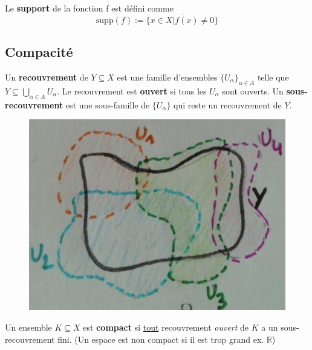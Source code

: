 \begin{definition}
    Le \textbf{support} de la fonction f est défini comme
	\begin{equation*}
		\text{supp}(f):=\overline{\{x\in X|f(x)\neq0\}}
	\end{equation*}
\end{definition}

\subsection{Compacité}

\begin{definition}
	Un \textbf{recouvrement} de $Y\subseteq X$ est une famille d'ensembles $\{U_\alpha\}_{\alpha\in A}$ telle que $Y\subseteq \bigcup_{\alpha\in A}U_\alpha$. Le recouvrement est \textbf{ouvert} si tous les $U_\alpha$ sont ouverts. Un \textbf{sous-recouvrement} est une sous-famille de $\{U_\alpha\}$ qui reste un recouvrement de $Y$. 
\end{definition}

\begin{figure}[H]
    \centering
    \includegraphics[scale = 0.4]{synthese_recouvrement.jpg}
\end{figure}

\begin{definition}
    Un ensemble $K\subseteq X$ est \textbf{compact} si \underline{tout} recouvrement \textit{ouvert} de $K$ a un sous-recouvrement fini. (Un espace est non compact si il est trop grand ex. $\mathbb{R}$)
\end{definition}

